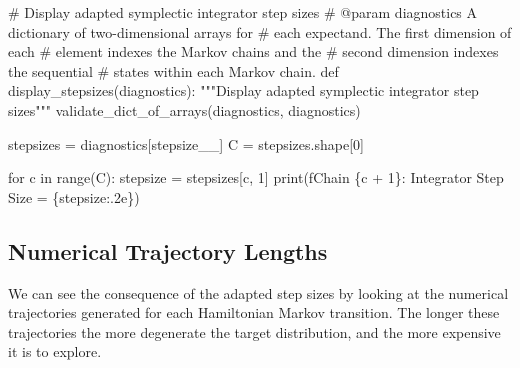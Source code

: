 \documentclass[
  letterpaper,
  DIV=11,
  numbers=noendperiod]{scrartcl}
\newenvironment{Shaded}{\begin{snugshade}}{\end{snugshade}}
\newcommand{\BuiltInTok}[1]{\textcolor[rgb]{0.00,0.23,0.31}{#1}}
\newcommand{\CommentTok}[1]{\textcolor[rgb]{0.37,0.37,0.37}{#1}}
\newcommand{\ControlFlowTok}[1]{\textcolor[rgb]{0.00,0.23,0.31}{#1}}
\newcommand{\DecValTok}[1]{\textcolor[rgb]{0.68,0.00,0.00}{#1}}
\newcommand{\KeywordTok}[1]{\textcolor[rgb]{0.00,0.23,0.31}{#1}}
\newcommand{\NormalTok}[1]{\textcolor[rgb]{0.00,0.23,0.31}{#1}}
\newcommand{\OperatorTok}[1]{\textcolor[rgb]{0.37,0.37,0.37}{#1}}
\newcommand{\SpecialCharTok}[1]{\textcolor[rgb]{0.37,0.37,0.37}{#1}}
\newcommand{\SpecialStringTok}[1]{\textcolor[rgb]{0.13,0.47,0.30}{#1}}
\newcommand{\StringTok}[1]{\textcolor[rgb]{0.13,0.47,0.30}{#1}}
\begin{document}
\begin{Shaded}
\begin{Highlighting}[]
\CommentTok{\# Display adapted symplectic integrator step sizes}
\CommentTok{\# @param diagnostics A dictionary of two{-}dimensional arrays for}
\CommentTok{\#                    each expectand.  The first dimension of each}
\CommentTok{\#                    element indexes the Markov chains and the}
\CommentTok{\#                    second dimension indexes the sequential}
\CommentTok{\#                    states within each Markov chain.}
\KeywordTok{def}\NormalTok{ display\_stepsizes(diagnostics):}
  \CommentTok{"""Display adapted symplectic integrator step sizes"""}
\NormalTok{  validate\_dict\_of\_arrays(diagnostics, }\StringTok{\textquotesingle{}diagnostics\textquotesingle{}}\NormalTok{)}

\NormalTok{  stepsizes }\OperatorTok{=}\NormalTok{ diagnostics[}\StringTok{\textquotesingle{}stepsize\_\_\textquotesingle{}}\NormalTok{]}
\NormalTok{  C }\OperatorTok{=}\NormalTok{ stepsizes.shape[}\DecValTok{0}\NormalTok{]}

  \ControlFlowTok{for}\NormalTok{ c }\KeywordTok{in} \BuiltInTok{range}\NormalTok{(C):}
\NormalTok{    stepsize }\OperatorTok{=}\NormalTok{ stepsizes[c, }\DecValTok{1}\NormalTok{]}
    \BuiltInTok{print}\NormalTok{(}\SpecialStringTok{f\textquotesingle{}Chain }\SpecialCharTok{\{}\NormalTok{c }\OperatorTok{+} \DecValTok{1}\SpecialCharTok{\}}\SpecialStringTok{: Integrator Step Size = }\SpecialCharTok{\{}\NormalTok{stepsize}\SpecialCharTok{:.2e\}}\SpecialStringTok{\textquotesingle{}}\NormalTok{)}
\end{Highlighting}
\end{Shaded}

\subsection{Numerical Trajectory
Lengths}\label{numerical-trajectory-lengths}

We can see the consequence of the adapted step sizes by looking at the
numerical trajectories generated for each Hamiltonian Markov transition.
The longer these trajectories the more degenerate the target
distribution, and the more expensive it is to explore.
\end{document}
